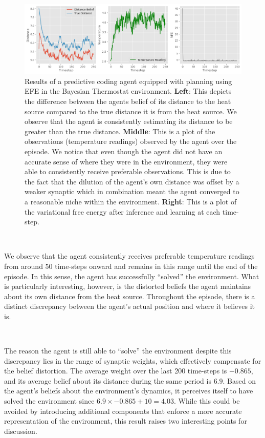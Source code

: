 \documentclass{article}
\begin{document}
\begin{figure}[htbp]
	\centering
	\includegraphics[scale=0.5]{images/pc_example_planning.png}
	\caption{Results of a predictive coding agent equipped with planning using EFE in the Bayesian Thermostat environment. \textbf{Left}: This depicts the difference between the agents belief of its distance to the heat source compared to the true distance it is from the heat source. We observe that the agent is consistently estimating its distance to be greater than the true distance. \textbf{Middle}: This is a plot of the observations (temperature readings) observed by the agent over the episode. We notice that even though the agent did not have an accurate sense of where they were in the environment, they were able to consistently receive preferable observations. This is due to the fact that the dilution of the agent's own distance was offset by a weaker synaptic which in combination meant the agent converged to a reasonable niche within the environment. \textbf{Right}: This is a plot of the variational free energy after inference and learning at each time-step.}
	\label{fig:pc_example_planning}
\end{figure}

\

We observe that the agent consistently receives preferable temperature readings from around 50 time-steps onward and remains in this range until the end of the episode. In this sense, the agent has successfully ``solved'' the environment. What is particularly interesting, however, is the distorted beliefs the agent maintains about its own distance from the heat source. Throughout the episode, there is a distinct discrepancy between the agent's actual position and where it believes it is.

\

The reason the agent is still able to ``solve'' the environment despite this discrepancy lies in the range of synaptic weights, which effectively compensate for the belief distortion. The average weight over the last 200 time-steps is $-0.865$, and its average belief about its distance during the same period is $6.9$. Based on the agent's beliefs about the environment's dynamics, it perceives itself to have solved the environment since $6.9 \times -0.865 + 10 = 4.03$. While this could be avoided by introducing additional components that enforce a more accurate representation of the environment, this result raises two interesting points for discussion.
\end{document}
